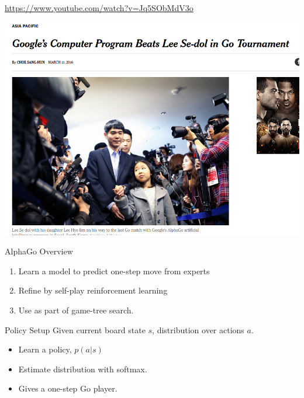 \documentclass{beamer}
\begin{document}
\begin{frame}
  \url{https://www.youtube.com/watch?v=Jq5SObMdV3o}
\end{frame}

\begin{frame}{}
  \begin{center}
    \includegraphics[width=\textwidth]{alphago/nyt}
  \end{center}
\end{frame}

\begin{frame}{AlphaGo Overview}

  \begin{enumerate}
  \item Learn a model to predict one-step move from experts
    \air 
  \item Refine by self-play reinforcement learning
    \air
  \item Use as part of game-tree search.
  \end{enumerate}
\end{frame}

\begin{frame}{Policy Setup}
  Given current board state $s$, distribution over actions $a$. 

  \begin{itemize}
  \item Learn a policy, $p(a | s)$ 
    \air 
  \item Estimate distribution with softmax.
    \air 
  \item Gives a one-step Go player. 
  \end{itemize}
\end{frame}
\end{document}
